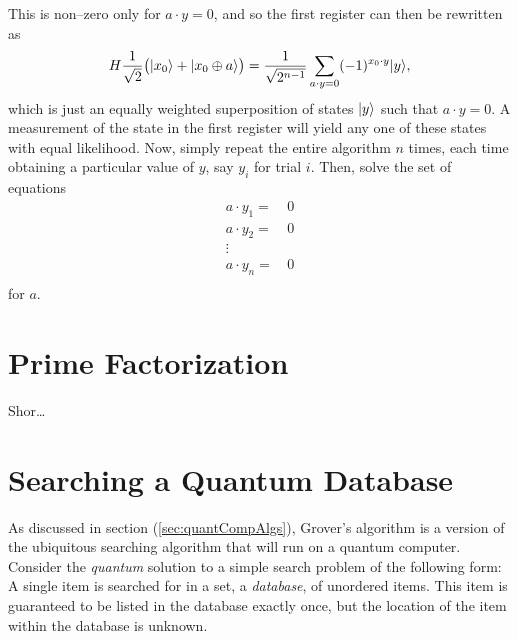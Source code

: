 This is non--zero only for $a\cdot y=0$, and so the first register
can then be rewritten as
\begin{equation}
H \frac{1}{\sqrt{2}}\bigl({|{x_0}\rangle}+{|{x_0\oplus a}\rangle}\bigr)
=\frac{1}{\sqrt{2^{n-1}}}\sum_{a\cdot y=0}
(-1)^{x_0\cdot y}{|{y}\rangle},
\end{equation}
which is just an equally weighted superposition of states
${|{y}\rangle}$ such that $a\cdot y = 0$.
A measurement of the state in the first register will yield
any one of these states with equal likelihood.  Now, simply
repeat the entire algorithm $n$ times, each time obtaining
a particular value of $y$, say $y_i$ for trial $i$.
Then, solve the set of equations
\begin{equation}
\begin{split}
a\cdot y_1 =&\, 0\\
a\cdot y_2 =&\, 0\\
\vdots\quad&\\
a\cdot y_n =&\, 0\\
\end{split}
\end{equation}
for $a$.




\section{Prime Factorization}

Shor\dots

\section{Searching a Quantum Database}
\label{sec:grover}

As discussed in section (\ref{sec:quantCompAlgs}), Grover's algorithm is
a version of the ubiquitous searching algorithm that will run on a quantum
computer.  Consider the {\sl quantum} solution to a simple search problem of 
the following form: A
single item is searched for in a set, a \emph{database}, of unordered items.  
This item is guaranteed to be listed in the database exactly once, but 
the location of the item within the database is unknown.

